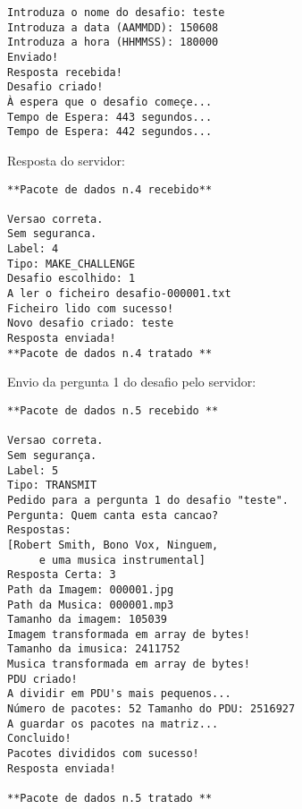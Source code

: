 \begin{multicols}{2}
{\begin{verbatim}
Introduza o nome do desafio: teste
Introduza a data (AAMMDD): 150608
Introduza a hora (HHMMSS): 180000
Enviado!
Resposta recebida!
Desafio criado!
À espera que o desafio começe...
Tempo de Espera: 443 segundos...
Tempo de Espera: 442 segundos...
\end{verbatim}

Resposta do servidor:
\begin{verbatim}
**Pacote de dados n.4 recebido**

Versao correta.
Sem seguranca.
Label: 4
Tipo: MAKE_CHALLENGE
Desafio escolhido: 1
A ler o ficheiro desafio-000001.txt
Ficheiro lido com sucesso!
Novo desafio criado: teste
Resposta enviada!
**Pacote de dados n.4 tratado **
\end{verbatim}

Envio da pergunta 1 do desafio pelo servidor:
\begin{verbatim}
**Pacote de dados n.5 recebido **

Versao correta.
Sem segurança.
Label: 5
Tipo: TRANSMIT
Pedido para a pergunta 1 do desafio "teste".
Pergunta: Quem canta esta cancao?
Respostas: 
[Robert Smith, Bono Vox, Ninguem, 
     e uma musica instrumental] 
Resposta Certa: 3
Path da Imagem: 000001.jpg
Path da Musica: 000001.mp3
Tamanho da imagem: 105039
Imagem transformada em array de bytes!
Tamanho da imusica: 2411752
Musica transformada em array de bytes!
PDU criado!
A dividir em PDU's mais pequenos...
Número de pacotes: 52 Tamanho do PDU: 2516927
A guardar os pacotes na matriz...
Concluido!
Pacotes divididos com sucesso!
Resposta enviada!

**Pacote de dados n.5 tratado **
\end{verbatim}
}
\end{multicols}
